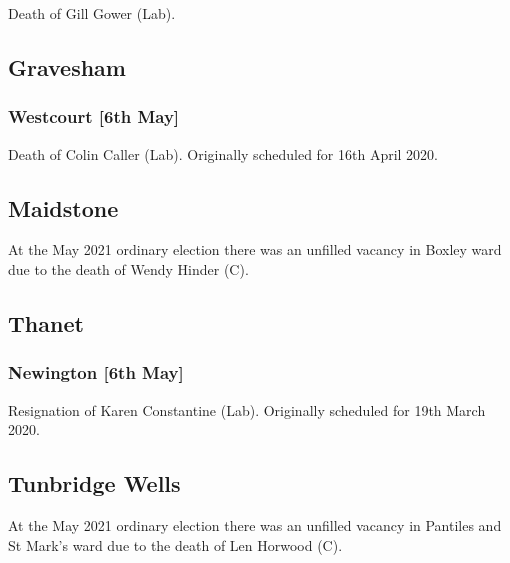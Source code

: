 \documentclass[a4paper,openany]{book}
\begin{document}
\begin{resultsiii}

Death of Gill Gower (Lab).

\subsection*{Gravesham}

\subsubsection*{Westcourt \hspace*{\fill}\nolinebreak[1]%
	\enspace\hspace*{\fill}
	[6th May]}


Death of Colin Caller (Lab).  Originally scheduled for 16th April 2020.

\subsection*{Maidstone}

At the May 2021 ordinary election there was an unfilled vacancy in Boxley ward due to the death of Wendy Hinder (C).

\subsection*{Thanet}

\subsubsection*{Newington \hspace*{\fill}\nolinebreak[1]%
	\enspace\hspace*{\fill}
	[6th May]}


Resignation of Karen Constantine (Lab).  Originally scheduled for 19th March 2020.

\subsection*{Tunbridge Wells}

At the May 2021 ordinary election there was an unfilled vacancy in Pantiles and St Mark's ward due to the death of Len Horwood (C).


\end{resultsiii}
\end{document}

